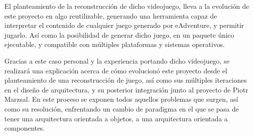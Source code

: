 El planteamiento de la reconstrucción de dicho videojuego, lleva a la evolución de este proyecto en algo reutilizable, generando una herramienta capaz de interpretar el contenido de cualquier juego generado por eAdventure, y permitir jugarlo. Así como la posibilidad de generar dicho juego, en un paquete único ejecutable, y compatible con múltiples plataformas y sistemas operativos.

Gracias a este caso personal y la experiencia portando dicho videojuego, se realizará una explicación acerca de cómo evolucionó este proyecto desde el planteamiento de una reconstrucción de juego, así como sus múltiples iteraciones en el diseño de arquitectura, y su posterior integración junto al proyecto de Piotr Marzsal. En este proceso se exponen todos aquellos problemas que surgen, así como su resolución, enfrentando un cambio de paradigma en el que se pasa de tener una arquitectura orientada a objetos, a una arquitectura orientada a componentes. 


%
%
%



